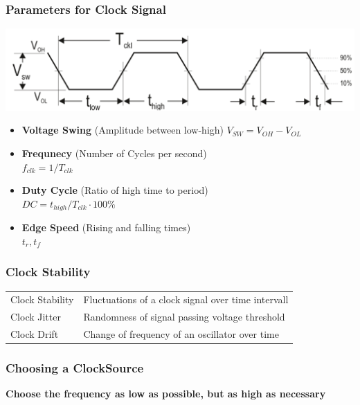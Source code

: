 \subsubsection{Parameters for Clock Signal }
\begin{minipage}{\linewidth}
    \centering
    \includegraphics[width=0.7\linewidth]{images/clock_parameters.png}
\end{minipage}
\begin{minipage}{\linewidth}
    \begin{multicols}{2}
	\begin{itemize}
		\item \textbf{Voltage Swing} (Amplitude between low-high) $V_{SW}=V_{OH}-V_{OL}$
		\item \textbf{Frequnecy} (Number of Cycles per second) \\$f_{clk}=1/T_{clk}$
		\item \textbf{Duty Cycle} (Ratio of high time to period)\\ $DC=t_{high}/T_{clk} \cdot 100 \%$
		\item \textbf{Edge Speed} (Rising and falling times)\\$t_r, t_f$
	\end{itemize}
\end{multicols}
\end{minipage}

\subsubsection{Clock Stability }
\begin{tabular}{ll}
	Clock Stability & Fluctuations of a clock signal over time intervall\\
	Clock Jitter & Randomness of signal passing voltage threshold\\
    Clock Drift & Change of frequency of an oscillator over time\\
\end{tabular}

\clearpage
\subsubsection{Choosing a ClockSource }
\begin{center}
    \begin{minipage}{7cm}
        \centering
        \textbf{Choose the frequency as low as possible, but as high as necessary}
    \end{minipage}
\end{center}

